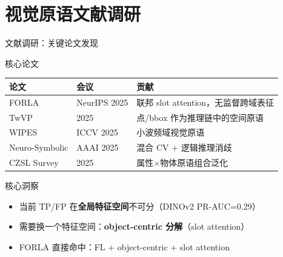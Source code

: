 \documentclass[aspectratio=169, 10pt]{beamer}
\begin{document}
\section{视觉原语文献调研}

\begin{frame}{文献调研：关键论文发现}
  \begin{block}{核心论文}
    \begin{tabular}{llp{6cm}}
      \toprule
      \textbf{论文} & \textbf{会议} & \textbf{贡献} \\
      \midrule
      FORLA & NeurIPS 2025 & 联邦 slot attention，无监督跨域表征 \\
      TwVP & 2025 & 点/bbox 作为推理链中的空间原语 \\
      WIPES & ICCV 2025 & 小波频域视觉原语 \\
      Neuro-Symbolic & AAAI 2025 & 混合 CV + 逻辑推理消歧 \\
      CZSL Survey & 2025 & 属性$\times$物体原语组合泛化 \\
      \bottomrule
    \end{tabular}
  \end{block}
  \vspace{0em}
  \begin{alertblock}{核心洞察}
    \begin{itemize}
      \item 当前 TP/FP 在\textbf{全局特征空间}不可分（DINOv2 PR-AUC=0.29）
      \item 需要换一个特征空间：\textbf{object-centric 分解}（slot attention）
      \item FORLA 直接命中：FL + object-centric + slot attention
    \end{itemize}
  \end{alertblock}
\end{frame}
\end{document}
